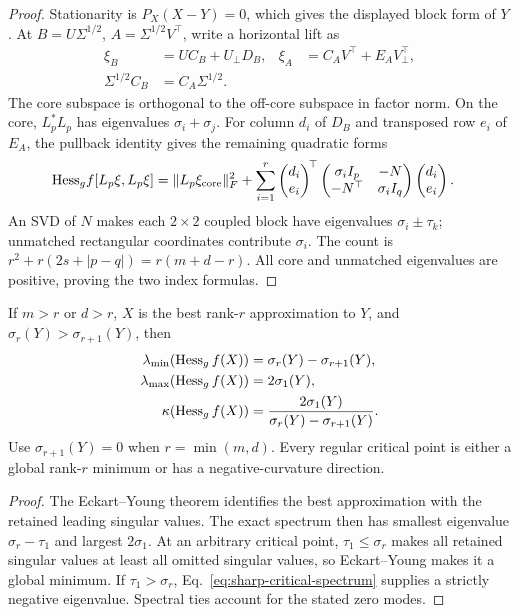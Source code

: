 \begin{proof}
Stationarity is $P_X(X-Y)=0$, which gives the displayed block form
of $Y$. At $B=U\Sigma^{1/2}$, $A=\Sigma^{1/2}V^\top$, write a
horizontal lift as
\begin{align}
\xi_B&=UC_B+U_\perp D_B,&
\xi_A&=C_AV^\top+E_AV_\perp^\top,\\
\Sigma^{1/2}C_B&=C_A\Sigma^{1/2}.
\end{align}
The core subspace is orthogonal to the off-core subspace in factor
norm. On the core, $L_p^*L_p$ has eigenvalues $\sigma_i+\sigma_j$.
For column $d_i$ of $D_B$ and transposed row $e_i$ of $E_A$,
the pullback identity gives the remaining quadratic forms
\begin{align}
{\rm Hess}_g f[L_p\xi,L_p\xi]
&=\|L_p\xi_{\rm core}\|_F^2+
\sum_{i=1}^r
\begin{pmatrix}d_i\\e_i\end{pmatrix}^{\!\top}
\begin{pmatrix}\sigma_i I_p&-N\\-N^\top&\sigma_i I_q\end{pmatrix}
\begin{pmatrix}d_i\\e_i\end{pmatrix}.
\end{align}
An SVD of $N$ makes each $2\times2$ coupled block have eigenvalues
$\sigma_i\pm\tau_k$; unmatched rectangular coordinates contribute
$\sigma_i$. The count is
$r^2+r(2s+|p-q|)=r(m+d-r)$.
All core and unmatched eigenvalues are positive, proving the two
index formulas.
\end{proof}

\begin{corollary}
\label{cor:sharp-gap-condition}
If $m>r$ or $d>r$, $X$ is the best rank-$r$ approximation to $Y$,
and $\sigma_r(Y)>\sigma_{r+1}(Y)$, then
\begin{align}
\lambda_{\min}(\operatorname{Hess}_g f(X))
&=\sigma_r(Y)-\sigma_{r+1}(Y),\\
\lambda_{\max}(\operatorname{Hess}_g f(X))&=2\sigma_1(Y),\\
\kappa(\operatorname{Hess}_g f(X))
&=\frac{2\sigma_1(Y)}
{\sigma_r(Y)-\sigma_{r+1}(Y)} .
\label{eq:sharp-gap-condition}
\end{align}
Use $\sigma_{r+1}(Y)=0$ when $r=\min(m,d)$.
Every regular critical point is either a global rank-$r$ minimum
or has a negative-curvature direction.
\end{corollary}
\begin{proof}
The Eckart--Young theorem \cite{eckart1936approximation} identifies
the best approximation with the retained leading singular values.
The exact spectrum then has smallest eigenvalue
$\sigma_r-\tau_1$ and largest $2\sigma_1$.
At an arbitrary critical point, $\tau_1\leq\sigma_r$ makes all
retained singular values at least all omitted singular values, so
Eckart--Young makes it a global minimum. If $\tau_1>\sigma_r$,
Eq.~\eqref{eq:sharp-critical-spectrum} supplies a strictly negative
eigenvalue. Spectral ties account for the stated zero modes.
\end{proof}

